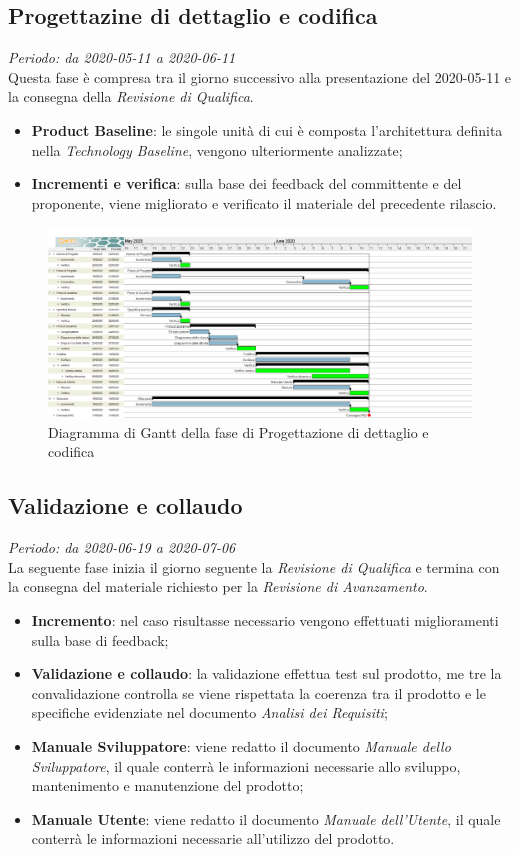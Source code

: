 \subsection{Progettazine di dettaglio e codifica}
\textit{Periodo: da 2020-05-11 a 2020-06-11}\\
Questa fase è compresa tra il giorno successivo alla presentazione del 2020-05-11 e la consegna della \textit{Revisione di Qualifica}.
\begin{itemize}
\item \textbf{Product Baseline}: le singole unità di cui è composta l'architettura definita nella \textit{Technology Baseline}, vengono ulteriormente analizzate;
\item \textbf{Incrementi e verifica}: sulla base dei feedback del committente e del proponente, viene migliorato e verificato il materiale del precedente rilascio.
\end{itemize}

\begin{figure}[H]
\centering
\includegraphics[scale=0.24]{./img/gantt/progettazione_dettaglio_codifica.png}
\caption{Diagramma di Gantt della fase di Progettazione di dettaglio e codifica}
\end{figure}

\subsection{Validazione e collaudo}
\textit{Periodo: da 2020-06-19 a 2020-07-06}\\
La seguente fase inizia il giorno seguente la \textit{Revisione di Qualifica} e termina con la consegna del materiale richiesto per la \textit{Revisione di Avanzamento}.
\begin{itemize}
\item \textbf{Incremento}: nel caso risultasse necessario vengono effettuati miglioramenti sulla base di feedback;
\item \textbf{Validazione e collaudo}: la validazione effettua test sul prodotto, me tre la convalidazione controlla se viene rispettata la coerenza tra il prodotto e le specifiche evidenziate nel documento \textit{Analisi dei Requisiti};
\item \textbf{Manuale Sviluppatore}: viene redatto il documento \textit{Manuale dello Sviluppatore}, il quale conterrà le informazioni necessarie allo sviluppo, mantenimento e manutenzione del prodotto;
\item \textbf{Manuale Utente}: viene redatto il documento \textit{Manuale dell'Utente}, il quale conterrà le informazioni necessarie all'utilizzo del prodotto.
\end{itemize}

